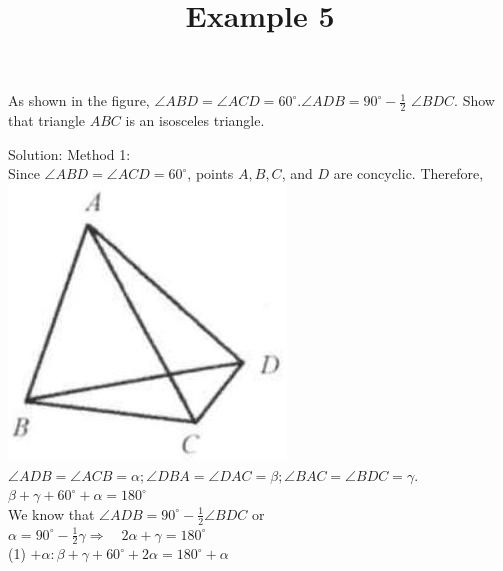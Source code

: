\documentclass{article}
\title{Example 5}
\date{}
\begin{document}
\maketitle

As shown in the figure, \(\angle A B D=\angle A C D=60^{\circ} . \angle A D B=90^{\circ}-\frac{1}{2}\) \(\angle B D C\). Show that triangle \(A B C\) is an isosceles triangle.

Solution:
Method 1:\\
Since \(\angle A B D=\angle A C D=60^{\circ}\), points \(A, B, C\), and \(D\) are concyclic. Therefore,\\
\centering
\includegraphics[width=\textwidth]{images/196(2).jpg}\\
\(\angle A D B=\angle A C B=\alpha ; \angle D B A=\angle D A C=\beta ; \angle B A C=\angle B D C=\gamma\).\\
\(\beta+\gamma+60^{\circ}+\alpha=180^{\circ}\)\\
We know that \(\angle A D B=90^{\circ}-\frac{1}{2} \angle B D C\) or\\
\(\alpha=90^{\circ}-\frac{1}{2} \gamma \Rightarrow \quad 2 \alpha+\gamma=180^{\circ}\)\\
(1) \(+\alpha: \beta+\gamma+60^{\circ}+2 \alpha=180^{\circ}+\alpha\)\\
\centering
\end{document}
